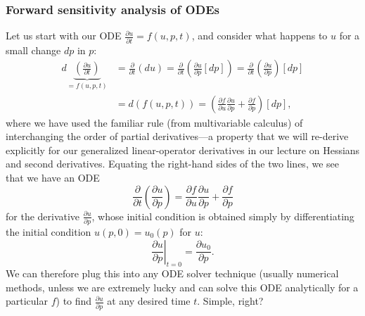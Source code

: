 \subsubsection{Forward sensitivity analysis of ODEs}

Let us start with our ODE $\frac{\partial u}{\partial t}=f(u,p,t)$,
and consider what happens to $u$ for a small change $dp$ in $p$:
\begin{align*}
d\underbrace{\left(\frac{\partial u}{\partial t}\right)}_{=f(u,p,t)} &= \frac{\partial}{\partial t} (du)
=
\frac{\partial}{\partial t}
\left( \frac{\partial u}{\partial p} [ dp ]\right)=\frac{\partial}{\partial t}\left(\frac{\partial u}{\partial p}\right)[dp] \\
&=d(f(u,p,t)) = \left(\frac{\partial f}{\partial u}\frac{\partial u}{\partial p}+\frac{\partial f}{\partial p}\right)[dp],
\end{align*}
where we have used the familiar rule (from multivariable calculus)
of interchanging the order of partial derivatives---a property that
we will re-derive explicitly for our generalized linear-operator derivatives
in our lecture on Hessians and second derivatives. Equating the right-hand sides of the two lines, we see that we
have an ODE 
\[
\boxed{\frac{\partial}{\partial t}\left(\frac{\partial u}{\partial p}\right)=\frac{\partial f}{\partial u}\frac{\partial u}{\partial p}+\frac{\partial f}{\partial p}}
\]
for the derivative $\frac{\partial u}{\partial p}$, whose initial
condition is obtained simply by differentiating the initial condition
$u(p,0)=u_{0}(p)$ for $u$:
\[
\left.\frac{\partial u}{\partial p}\right|_{t=0}=\frac{\partial u_{0}}{\partial p}.
\]
We can therefore plug this into any ODE solver technique (usually
numerical methods, unless we are extremely lucky and can solve this
ODE analytically for a particular $f$) to find $\frac{\partial u}{\partial p}$
at any desired time $t$. Simple, right?

